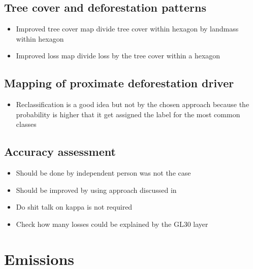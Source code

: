 		\subsection{Tree cover and deforestation patterns}
		\label{subsec:discussion_tree_cover_and_deforestation}
			\begin{itemize}
				\item Improved tree cover map divide tree cover within hexagon by landmass within hexagon
				\item Improved loss map divide loss by the tree cover within a hexagon
			\end{itemize}

		\subsection{Mapping of proximate deforestation driver}
		\label{subsec:discussion_proxy_deforestation_driver}
			\begin{itemize}
				\item Reclassification is a good idea but not by the chosen approach because the probability is higher that it get assigned the label for the most common classes 
			\end{itemize}

		\subsection{Accuracy assessment}
		\label{subsec:discussion_accuracy_assessment}
			\begin{itemize}
				\item Should be done by independent person was not the case
				\item Should be improved by using approach discussed in \citep{Olofsson2014}
				\item Do shit talk on kappa is not required
				\item Check how many losses could be explained by the \ac{GL30} layer
			\end{itemize}

	\section{Emissions}

